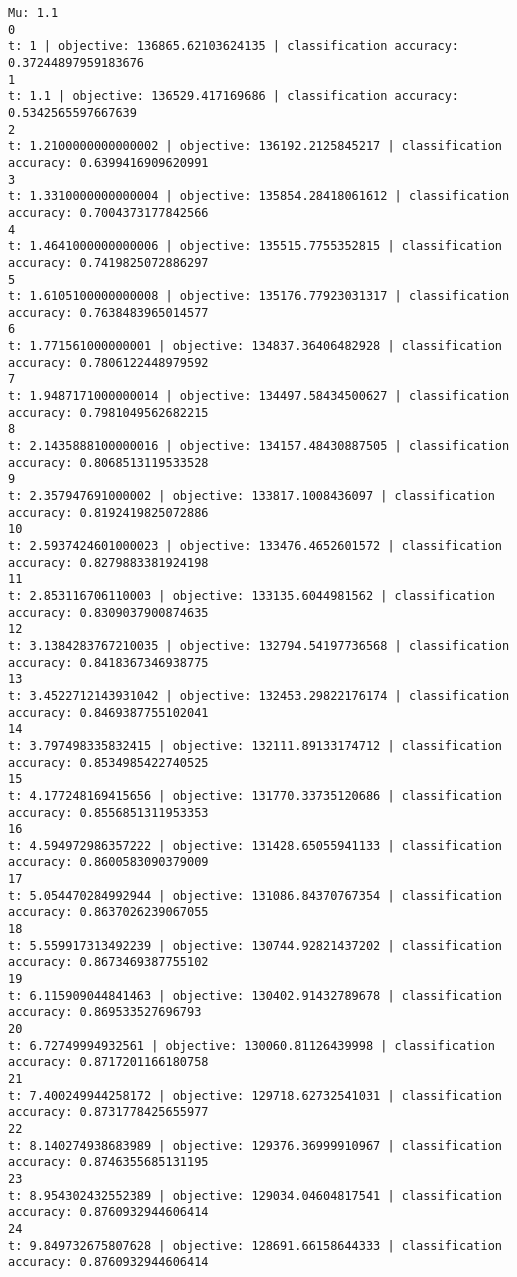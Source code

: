 \documentclass[11pt]{article}
\theoremstyle{remark}
\begin{document}
\begin{itemize}
\begin{verbatim}
Mu: 1.1
0
t: 1 | objective: 136865.62103624135 | classification accuracy: 0.37244897959183676
1
t: 1.1 | objective: 136529.417169686 | classification accuracy: 0.5342565597667639
2
t: 1.2100000000000002 | objective: 136192.2125845217 | classification accuracy: 0.6399416909620991
3
t: 1.3310000000000004 | objective: 135854.28418061612 | classification accuracy: 0.7004373177842566
4
t: 1.4641000000000006 | objective: 135515.7755352815 | classification accuracy: 0.7419825072886297
5
t: 1.6105100000000008 | objective: 135176.77923031317 | classification accuracy: 0.7638483965014577
6
t: 1.771561000000001 | objective: 134837.36406482928 | classification accuracy: 0.7806122448979592
7
t: 1.9487171000000014 | objective: 134497.58434500627 | classification accuracy: 0.7981049562682215
8
t: 2.1435888100000016 | objective: 134157.48430887505 | classification accuracy: 0.8068513119533528
9
t: 2.357947691000002 | objective: 133817.1008436097 | classification accuracy: 0.8192419825072886
10
t: 2.5937424601000023 | objective: 133476.4652601572 | classification accuracy: 0.8279883381924198
11
t: 2.853116706110003 | objective: 133135.6044981562 | classification accuracy: 0.8309037900874635
12
t: 3.1384283767210035 | objective: 132794.54197736568 | classification accuracy: 0.8418367346938775
13
t: 3.4522712143931042 | objective: 132453.29822176174 | classification accuracy: 0.8469387755102041
14
t: 3.797498335832415 | objective: 132111.89133174712 | classification accuracy: 0.8534985422740525
15
t: 4.177248169415656 | objective: 131770.33735120686 | classification accuracy: 0.8556851311953353
16
t: 4.594972986357222 | objective: 131428.65055941133 | classification accuracy: 0.8600583090379009
17
t: 5.054470284992944 | objective: 131086.84370767354 | classification accuracy: 0.8637026239067055
18
t: 5.559917313492239 | objective: 130744.92821437202 | classification accuracy: 0.8673469387755102
19
t: 6.115909044841463 | objective: 130402.91432789678 | classification accuracy: 0.869533527696793
20
t: 6.72749994932561 | objective: 130060.81126439998 | classification accuracy: 0.8717201166180758
21
t: 7.400249944258172 | objective: 129718.62732541031 | classification accuracy: 0.8731778425655977
22
t: 8.140274938683989 | objective: 129376.36999910967 | classification accuracy: 0.8746355685131195
23
t: 8.954302432552389 | objective: 129034.04604817541 | classification accuracy: 0.8760932944606414
24
t: 9.849732675807628 | objective: 128691.66158644333 | classification accuracy: 0.8760932944606414



\end{verbatim}
\end{itemize}
\end{document}
